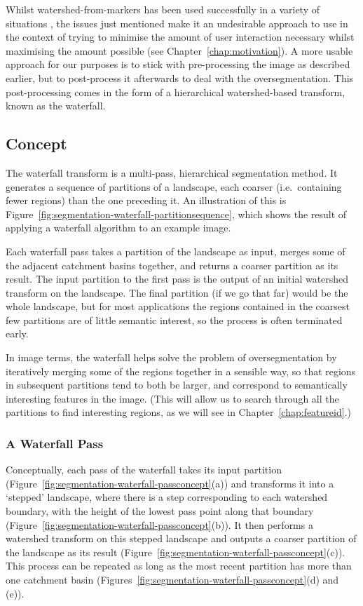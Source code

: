 Whilst watershed-from-markers has been used successfully in a variety of situations \cite{?}, the issues just mentioned make it an undesirable approach to use in the context of trying to minimise the amount of user interaction necessary whilst maximising the amount possible (see Chapter~\ref{chap:motivation}). A more usable approach for our purposes is to stick with pre-processing the image as described earlier, but to post-process it afterwards to deal with the oversegmentation. This post-processing comes in the form of a hierarchical watershed-based transform, known as the waterfall.

\subsection{Concept}

The waterfall transform is a multi-pass, hierarchical segmentation method. It generates a sequence of partitions of a landscape, each coarser (i.e.~containing fewer regions) than the one preceding it. An illustration of this is Figure~\ref{fig:segmentation-waterfall-partitionsequence}, which shows the result of applying a waterfall algorithm to an example image.


Each waterfall pass takes a partition of the landscape as input, merges some of the adjacent catchment basins together, and returns a coarser partition as its result. The input partition to the first pass is the output of an initial watershed transform on the landscape. The final partition (if we go that far) would be the whole landscape, but for most applications the regions contained in the coarsest few partitions are of little semantic interest, so the process is often terminated early.

In image terms, the waterfall helps solve the problem of oversegmentation by iteratively merging some of the regions together in a sensible way, so that regions in subsequent partitions tend to both be larger, and correspond to semantically interesting features in the image. (This will allow us to search through all the partitions to find interesting regions, as we will see in Chapter~\ref{chap:featureid}.)

\subsubsection{A Waterfall Pass}

Conceptually, each pass of the waterfall takes its input partition (Figure~\ref{fig:segmentation-waterfall-passconcept}(a)) and transforms it into a `stepped' landscape, where there is a step corresponding to each watershed boundary, with the height of the lowest pass point along that boundary (Figure~\ref{fig:segmentation-waterfall-passconcept}(b)). It then performs a watershed transform on this stepped landscape and outputs a coarser partition of the landscape as its result (Figure~\ref{fig:segmentation-waterfall-passconcept}(c)). This process can be repeated as long as the most recent partition has more than one catchment basin (Figures~\ref{fig:segmentation-waterfall-passconcept}(d) and (e)).

